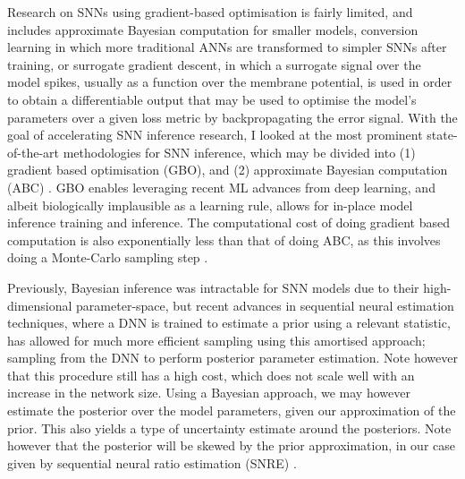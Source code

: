 \documentclass[mphil,deptreport,ai]{infthesis} %
\begin{document}
Research on SNNs using gradient-based optimisation is fairly limited, and includes approximate Bayesian computation for smaller models, conversion learning in which more traditional ANNs are transformed to simpler SNNs after training, or surrogate gradient descent, in which a surrogate signal over the model spikes, usually as a function over the membrane potential, is used in order to obtain a differentiable output that may be used to optimise the model's parameters over a given loss metric by backpropagating the error signal.
With the goal of accelerating SNN inference research, I looked at the most prominent state-of-the-art methodologies for SNN inference, which may be divided into (1) gradient based optimisation (GBO), and (2) approximate Bayesian computation (ABC) \cite{Lueckmann2018, Rene2020, Cranmer2020a, Lueckmann2021}.
GBO enables leveraging recent ML advances from deep learning, and albeit biologically implausible as a learning rule, allows for in-place model inference training and inference. The computational cost of doing gradient based computation is also exponentially less than that of doing ABC, as this involves doing a Monte-Carlo sampling step \cite{Rene2020}.

Previously, Bayesian inference was intractable for SNN models due to their high-dimensional parameter-space, but recent advances in sequential neural estimation techniques, where a DNN is trained to estimate a prior using a relevant statistic, has allowed for much more efficient sampling using this amortised approach; sampling from the DNN to perform posterior parameter estimation.
Note however that this procedure still has a high cost, which does not scale well with an increase in the network size.
Using a Bayesian approach, we may however estimate the posterior over the model parameters, given our approximation of the prior. This also yields a type of uncertainty estimate around the posteriors. Note however that the posterior will be skewed by the prior approximation, in our case given by sequential neural ratio estimation (SNRE) \cite{Lueckmann2021}.
 
\end{document}
